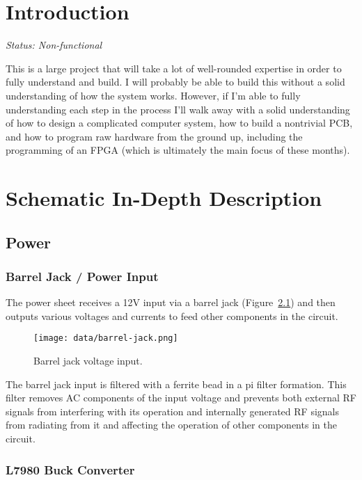 \documentclass{default}
\begin{document}
\tableofcontents

\chapter{Introduction}
\textit{Status: Non-functional}

This is a large project that will take a lot of well-rounded expertise in order to fully understand
and build. I will probably be able to build this without a solid understanding of how the system
works. However, if I'm able to fully understanding each step in the process I'll walk away with a
solid understanding of how to design a complicated computer system, how to build a nontrivial PCB,
and how to program raw hardware from the ground up, including the programming of an FPGA (which is
ultimately the main focus of these months).

\chapter{Schematic In-Depth Description}

\section{Power}

\subsection{Barrel Jack / Power Input}
\label{sec:power-input}

The power sheet receives a 12V input via a barrel jack (Figure~\ref{fig:barrel-jack}) and then
outputs various voltages and currents to feed other components in the circuit.

\begin{figure}[h]
  \centering
  \texttt{[image: data/barrel-jack.png]}
  \caption{Barrel jack voltage input.}
  \label{fig:barrel-jack}
\end{figure}

The barrel jack input is filtered with a ferrite bead in a pi filter formation. This filter removes
AC components of the input voltage and prevents both external RF signals from interfering with its
operation and internally generated RF signals from radiating from it and affecting the operation of
other components in the circuit.

\subsection{L7980 Buck Converter}
\label{sec:l7980-buck}
\end{document}
